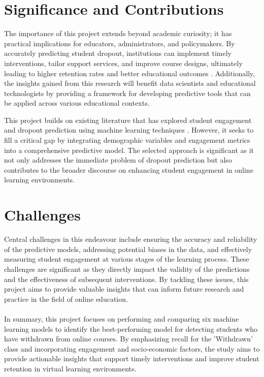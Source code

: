 \documentclass[ %
                    author={Carlos Duran Calle},
                supervisor={Dr. Felipe Campelo},
                    degree={MSc},
                     title={Comparative Machine Learning Analysis for Student Dropout Prediction in a Virtual Learning Environment},
                  subtitle={Incorporating Student Engagement and Socio-Economic Features},
                      type={},
                      year={2025}]{dissertation}
\begin{document}
\section{Significance and Contributions}
The importance of this project extends beyond academic curiosity; it has practical implications for educators, administrators, and policymakers. By accurately predicting student dropout, institutions can implement timely interventions, tailor support services, and improve course designs, ultimately leading to higher retention rates and better educational outcomes \cite{kahu_student_engagement_2013}. Additionally, the insights gained from this research will benefit data scientists and educational technologists by providing a framework for developing predictive tools that can be applied across various educational contexts.

This project builds on existing literature that has explored student engagement and dropout prediction using machine learning techniques \cite{tomasevic_comparison_supervised_data_2020, hussain_student_engagement_prediction_2018}. However, it seeks to fill a critical gap by integrating demographic variables and engagement metrics into a comprehensive predictive model. The selected approach is significant as it not only addresses the immediate problem of dropout prediction but also contributes to the broader discourse on enhancing student engagement in online learning environments.

\section{Challenges}
Central challenges in this endeavour include ensuring the accuracy and reliability of the predictive models, addressing potential biases in the data, and effectively measuring student engagement at various stages of the learning process. These challenges are significant as they directly impact the validity of the predictions and the effectiveness of subsequent interventions. By tackling these issues, this project aims to provide valuable insights that can inform future research and practice in the field of online education.

\paragraph{}
In summary, this project focuses on performing and comparing six machine learning models to identify the best-performing model for detecting students who have withdrawn from online courses. By emphasizing recall for the 'Withdrawn' class and incorporating engagement and socio-economic factors, the study aims to provide actionable insights that support timely interventions and improve student retention in virtual learning environments.
 
\end{document}
